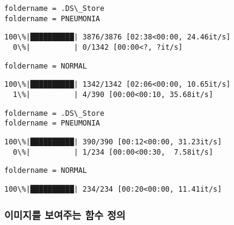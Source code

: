 \documentclass[11pt]{article}
\begin{document}
    \begin{Verbatim}[commandchars=\\\{\}]
foldername = .DS\_Store
foldername = PNEUMONIA

    \end{Verbatim}

    \begin{Verbatim}[commandchars=\\\{\}]
100\%|██████████| 3876/3876 [02:38<00:00, 24.46it/s]
  0\%|          | 0/1342 [00:00<?, ?it/s]
    \end{Verbatim}

    \begin{Verbatim}[commandchars=\\\{\}]
foldername = NORMAL

    \end{Verbatim}

    \begin{Verbatim}[commandchars=\\\{\}]
100\%|██████████| 1342/1342 [02:06<00:00, 10.65it/s]
  1\%|          | 4/390 [00:00<00:10, 35.68it/s]
    \end{Verbatim}

    \begin{Verbatim}[commandchars=\\\{\}]
foldername = .DS\_Store
foldername = PNEUMONIA

    \end{Verbatim}

    \begin{Verbatim}[commandchars=\\\{\}]
100\%|██████████| 390/390 [00:12<00:00, 31.23it/s]
  0\%|          | 1/234 [00:00<00:30,  7.58it/s]
    \end{Verbatim}

    \begin{Verbatim}[commandchars=\\\{\}]
foldername = NORMAL

    \end{Verbatim}

    \begin{Verbatim}[commandchars=\\\{\}]
100\%|██████████| 234/234 [00:20<00:00, 11.41it/s]

    \end{Verbatim}

    \hypertarget{uxc774uxbbf8uxc9c0uxb97c-uxbcf4uxc5ecuxc8fcuxb294-uxd568uxc218-uxc815uxc758}{%
\subsubsection{이미지를 보여주는 함수
정의}\label{uxc774uxbbf8uxc9c0uxb97c-uxbcf4uxc5ecuxc8fcuxb294-uxd568uxc218-uxc815uxc758}}
\end{document}
